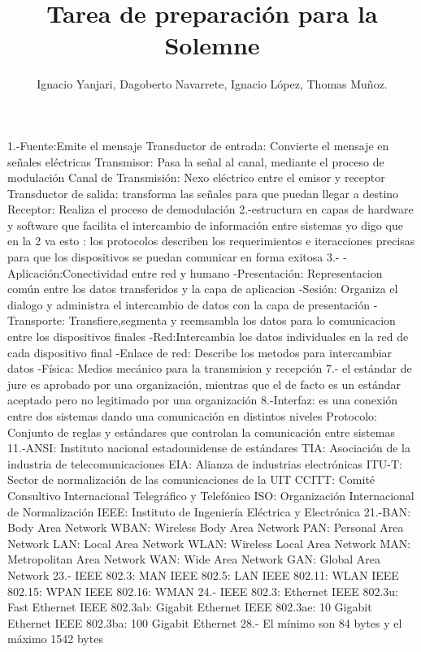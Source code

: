\documentclass{udparticle}
\title{Tarea de preparación para la Solemne}
\author{Ignacio Yanjari, Dagoberto Navarrete, Ignacio López, Thomas Muñoz.}
\begin{document}
\maketitle
\begin{enumerate}
1.-Fuente:Emite el mensaje
Transductor de entrada: Convierte el mensaje en señales eléctricas
Transmisor: Pasa la señal al canal, mediante el proceso de modulación
Canal de Transmisión: Nexo eléctrico entre el emisor y receptor
Transductor de salida: transforma las señales para que puedan llegar a destino
Receptor: Realiza el proceso de demodulación 
2.-estructura en capas de hardware y software que facilita el intercambio de información entre sistemas
yo digo que en la 2 va esto : los protocolos describen los requerimientos e iteracciones precisas para que los
dispositivos se puedan comunicar en forma exitosa
3.- -Aplicación:Conectividad entre red y humano
    -Presentación: Representacion común entre los datos transferidos y la capa de aplicacion
    -Sesión: Organiza el dialogo y administra el intercambio de datos con la capa de presentación
    -Transporte: Transfiere,segmenta y reemsambla los datos para lo comunicacion entre los dispositivos finales
    -Red:Intercambia los datos individuales en la red de cada dispositivo final
    -Enlace de red: Describe los metodos para intercambiar datos
    -Física: Medios mecánico para la transmision y recepción
7.- el estándar de jure es aprobado por una organización, mientras que el de facto es un estándar aceptado pero no legitimado por una organización
8.-Interfaz: es una conexión entre dos sistemas dando una comunicación en distintos niveles
Protocolo: Conjunto de reglas y estándares que controlan la comunicación entre sistemas
11.-ANSI: Instituto nacional estadounidense de estándares
TIA: Asociación de la industria de telecomunicaciones
EIA: Alianza de industrias electrónicas
ITU-T: Sector de normalización de las comunicaciones de la UIT
CCITT: Comité Consultivo Internacional Telegráfico y Telefónico
ISO: Organización Internacional de Normalización
IEEE: Instituto de Ingeniería Eléctrica y Electrónica
21.-BAN: Body Area Network
WBAN: Wireless Body Area Network
PAN: Personal Area Network
LAN: Local Area Network
WLAN: Wireless Local Area Network
MAN: Metropolitan Area Network
WAN: Wide Area Network
GAN: Global Area Network
23.- IEEE 802.3: MAN
IEEE 802.5: LAN
IEEE 802.11: WLAN
IEEE 802.15: WPAN
IEEE 802.16: WMAN
24.- IEEE 802.3: Ethernet
IEEE   802.3u: Fast Ethernet
IEEE  802.3ab: Gigabit Ethernet
IEEE 802.3ae: 10 Gigabit Ethernet
IEEE 802.3ba: 100 Gigabit Ethernet
28.- El mínimo son 84 bytes y el máximo 1542 bytes

\end{enumerate}
\end{document}
